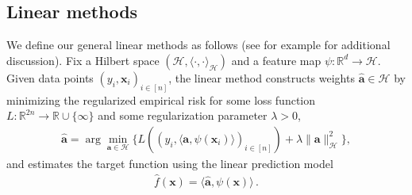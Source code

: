 \documentclass[11pt]{article}
\newcommand{\R}{\mathbb{R}}
\newcommand{\<}{\langle}
\renewcommand{\>}{\rangle}
\theoremstyle{definition}
\def\ba{{\boldsymbol a}}
\def\bx{{\boldsymbol x}}
\def\hf{{\hat f}}
\def\cH{{\mathcal H}}
\def\bx{{\boldsymbol x}}
\def\ba{{\boldsymbol a}}
\def\hf{\hat f}
\def\cH{\mathcal{H}}
\begin{document}
\subsection{Linear methods}
We define our general linear methods as follows (see for example \cite[Appendix H]{abbe2022merged} for additional discussion). Fix a Hilbert space $(\cH, \<\cdot, \cdot\>_{\cH})$ and a feature map $\psi : \R^d \to \cH$. Given data points $(y_i,\bx_i)_{i \in [n]}$, the linear method constructs weights $\hat{\ba} \in \cH$ by minimizing the regularized empirical risk for some loss function $L : \R^{2n} \to \R \cup \{\infty\}$ and some regularization parameter $\lambda > 0$,
\begin{align*}
\hat{\ba} = \arg\min_{\ba \in \cH} \{L((y_i, \<\ba,\psi(\bx_i)\>)_{i \in [n]}) + \lambda \|\ba\|_{\cH}^2\},
\end{align*}
and estimates the target function using the linear prediction model
\begin{align*}
\hf(\bx) = \<\hat{\ba}, \psi(\bx)\>\,.
\end{align*}
\end{document}
